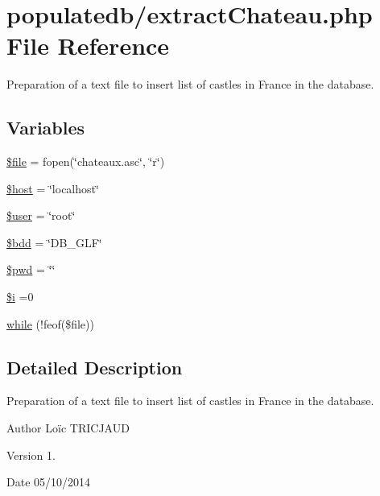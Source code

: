 \hypertarget{extract_chateau_8php}{\section{populatedb/extract\-Chateau.php File Reference}
\label{extract_chateau_8php}
}


Preparation of a text file to insert list of castles in France in the database.  


\subsection*{Variables}
\begin{DoxyCompactItemize}
\item 
\hyperlink{extract_chateau_8php_aa1bfbd27060176201b271918dff57e8f}{\$file} = fopen(\char`\"{}chateaux.\-asc\char`\"{}, \char`\"{}r\char`\"{})
\item 
\hyperlink{extract_chateau_8php_a711797613cb863ca0756df789c396bf2}{\$host} = \char`\"{}localhost\char`\"{}
\item 
\hyperlink{extract_chateau_8php_a598ca4e71b15a1313ec95f0df1027ca5}{\$user} = \char`\"{}root\char`\"{}
\item 
\hyperlink{extract_chateau_8php_a94f91e878bce0991e2cd595c5dd79b3f}{\$bdd} = \char`\"{}D\-B\-\_\-\-G\-L\-F\char`\"{}
\item 
\hyperlink{extract_chateau_8php_a12e4252e778952d356721bc655cff8c8}{\$pwd} = \char`\"{}\char`\"{}
\item 
\hyperlink{extract_chateau_8php_a83018d9153d17d91fbcf3bc10158d34f}{\$i} =0
\item 
\hyperlink{extract_chateau_8php_a4eebe21070c3a655a77e55ea3fe137f5}{while} (!feof(\$file))
\end{DoxyCompactItemize}


\subsection{Detailed Description}
Preparation of a text file to insert list of castles in France in the database. \begin{DoxyAuthor}{Author}
Loïc T\-R\-I\-C\-J\-A\-U\-D 
\end{DoxyAuthor}
\begin{DoxyVersion}{Version}
1. 
\end{DoxyVersion}
\begin{DoxyDate}{Date}
05/10/2014 
\end{DoxyDate}


